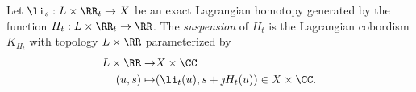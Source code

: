 
    Let $\li_s: L\times \RR_t\to X$ be an exact Lagrangian homotopy generated by the function $H_t: L\times \RR_t\to \RR$. 
    The \emph{suspension} of $H_t$ is the Lagrangian cobordism $K_{H_t}$ with topology $L\times \RR$ parameterized by 
    \begin{align*}
          L\times \RR\to & X\times \CC\\
           (u, s)\mapsto& (\li_t(u), s+\jmath H_t(u))\in X\times \CC.
    \end{align*}
